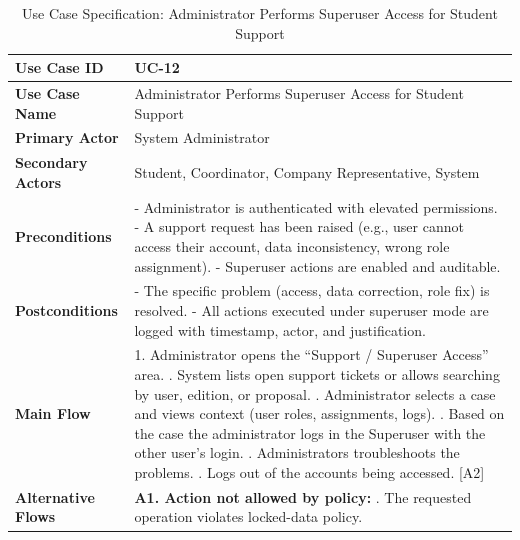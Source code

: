 \newpage
\renewcommand{\arraystretch}{1.5} 
\begin{xltabular}{\textwidth}{|l|X|}
    \caption{Use Case Specification: Administrator Performs Superuser Access for Student Support} \label{tab:UC-12} \\
    
    \hline
    \textbf{Use Case ID} & UC-12 \\ \hline
    \textbf{Use Case Name} & Administrator Performs Superuser Access for Student Support \\ \hline
    \textbf{Primary Actor} & System Administrator \\ \hline
    \textbf{Secondary Actors} & Student, Coordinator, Company Representative, System \\ \hline
    \textbf{Preconditions} &
        - Administrator is authenticated with elevated permissions. \newline
        - A support request has been raised (e.g., user cannot access their account, data inconsistency, wrong role assignment). \newline
        - Superuser actions are enabled and auditable.
        \\ \hline
    \textbf{Postconditions} &
        - The specific problem (access, data correction, role fix) is resolved. \newline
        - All actions executed under superuser mode are logged with timestamp, actor, and justification.
        \\ \hline
    \textbf{Main Flow} &
        1. Administrator opens the “Support / Superuser Access” area. . System lists open support tickets or allows searching by user, edition, or proposal. . Administrator selects a case and views context (user roles, assignments, logs). . Based on the case the administrator logs in the Superuser with the other user's login. . Administrators troubleshoots the problems. . Logs out of the accounts being accessed. [A2] \\ \hline 
    \textbf{Alternative Flows} &
        \textbf{A1. Action not allowed by policy:} . The requested operation violates locked-data policy. \newline

\end{xltabular}
